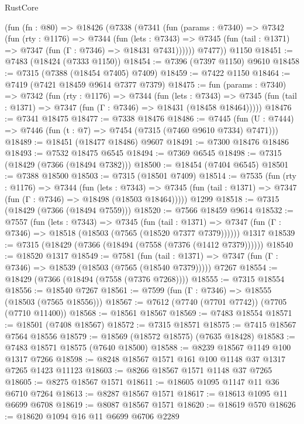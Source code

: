 \begin{lexlean}{RustCore}
\begin{coremodule}
    (fun (fn : @80) =>
    @18426
      (@7338
        (@7341
          (fun (params : @7340) =>
          @7342
            (fun (rty : @1176) =>
            @7344
              (fun (lets : @7343) =>
              @7345 (fun (tail : @1371) => @7347 (fun (Γ : @7346) => @18431 @7431))))))
        @7477))
    @1150
@18451 := @7483 (@18424 (@7333 @1150))
@18454 := @7396 (@7397 @1150) @9610
@18458 := @7315 (@7388 (@18454 @7405) @7409)
@18459 := @7422 @1150
@18464 := @7419 (@7421 @18459 @9614 @7377 @7379)
@18475 := fun (params : @7340) =>
  @7342
    (fun (rty : @1176) =>
    @7344
      (fun (lets : @7343) =>
      @7345 (fun (tail : @1371) => @7347 (fun (Γ : @7346) => @18431 (@18458 @18464)))))
@18476 := @7341 @18475
@18477 := @7338 @18476
@18486 := @7445 (fun (U : @7444) => @7446 (fun (t : @7) => @7454 (@7315 (@7460 @9610 @7334) @7471)))
@18489 := @18451 (@18477 @18486) @9607
@18491 := @7300 @18476 @18486
@18493 := @7532 @18475 @6545
@18494 := @7369 @6545
@18498 := @7315 (@18429 (@7366 (@18494 @7382)))
@18500 := @18454 (@7404 @6545)
@18501 := @7388 @18500
@18503 := @7315 (@18501 @7409)
@18514 := @7535
    (fun (rty : @1176) =>
    @7344
      (fun (lets : @7343) =>
      @7345 (fun (tail : @1371) => @7347 (fun (Γ : @7346) => @18498 (@18503 @18464)))))
    @1299
@18518 := @7315 (@18429 (@7366 (@18494 @7559)))
@18520 := @7566 @18459 @9614
@18532 := @7557
    (fun (lets : @7343) =>
    @7345
      (fun (tail : @1371) =>
      @7347 (fun (Γ : @7346) => @18518 (@18503 (@7565 (@18520 @7377 @7379))))))
    @1317
@18539 := @7315 (@18429 (@7366 (@18494 (@7558 (@7376 (@1412 @7379))))))
@18540 := @18520 @1317
@18549 := @7581
    (fun (tail : @1371) => @7347 (fun (Γ : @7346) => @18539 (@18503 (@7565 (@18540 @7379)))))
    @7267
@18554 := @18429 (@7366 (@18494 (@7558 (@7376 @7268))))
@18555 := @7315 @18554
@18556 := @18540 @7267
@18561 := @7599 (fun (Γ : @7346) => @18555 (@18503 (@7565 @18556)))
@18567 := @7612 (@7740 (@7701 @7742)) (@7705 (@7710 @11400))
@18568 := @18561 @18567
@18569 := @7483 @18554
@18571 := @18501 (@7408 @18567)
@18572 := @7315 @18571
@18575 := @7415 @18567 @7564 @18556
@18579 := @18569 (@18572 @18575) (@7635 @18428)
@18583 := @7483 @18571 @18575 (@7640 @18500)
@18588 := @8239 @18567 @1149 @100 @1317 @7266
@18598 := @8248 @18567 @1571 @161 @100 @1148 @37 @1317 @7265 @1423 @11123
@18603 := @8266 @18567 @1571 @1148 @37 @7265
@18605 := @8275 @18567 @1571
@18611 := @18605 @1095 @1147 @11 @36 @6710 @7264
@18613 := @8287 @18567 @1571
@18617 := @18613 @1095 @11 @6699 @6708
@18619 := @8087 @18567 @1571
@18620 := @18619 @570
@18626 := @18620 @1094 @16 @11 @6699 @6706 @2289

\end{coremodule}
\end{lexlean}
